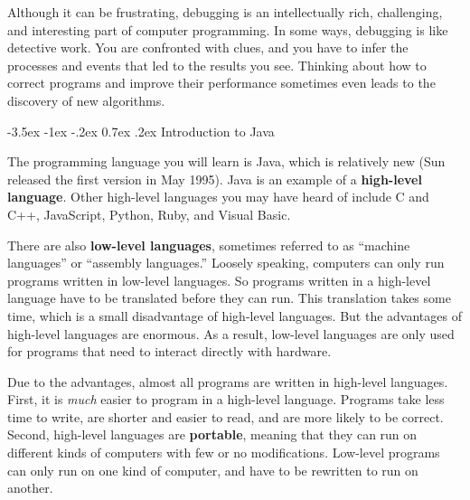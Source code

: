 \documentclass[12pt]{book}
\makeatletter
\theoremstyle{exercise}
\renewcommand{\section}{\@startsection {section}{1}{\z@}%
    {-3.5ex \@plus -1ex \@minus -.2ex}%
    {0.7ex \@plus.2ex}%
    {\normalfont\Large\bfseries}}
\makeatother
\begin{document}


Although it can be frustrating, debugging is an intellectually rich, challenging, and interesting part of computer programming.
In some ways, debugging is like detective work.
You are confronted with clues, and you have to infer the processes and events that led to the results you see.
Thinking about how to correct programs and improve their performance sometimes even leads to the discovery of new algorithms.


\section{Introduction to Java}


The programming language you will learn is Java, which is relatively new (Sun released the first version in May 1995).
Java is an example of a {\bf high-level language}.
Other high-level languages you may have heard of include C and C++, JavaScript, Python, Ruby, and Visual Basic.


There are also {\bf low-level languages}, sometimes referred to as ``machine languages'' or ``assembly languages.''
Loosely speaking, computers can only run programs written in low-level languages.
So programs written in a high-level language have to be translated before they can run.
This translation takes some time, which is a small disadvantage of high-level languages.
But the advantages of high-level languages are enormous.
As a result, low-level languages are only used for programs that need to interact directly with hardware.


Due to the advantages, almost all programs are written in high-level languages.
First, it is {\em much} easier to program in a high-level language.
Programs take less time to write, are shorter and easier to read, and are more likely to be correct.
Second, high-level languages are {\bf portable}, meaning that they can run on different kinds of computers with few or no modifications.
Low-level programs can only run on one kind of computer, and have to be rewritten to run on another.
\end{document}

